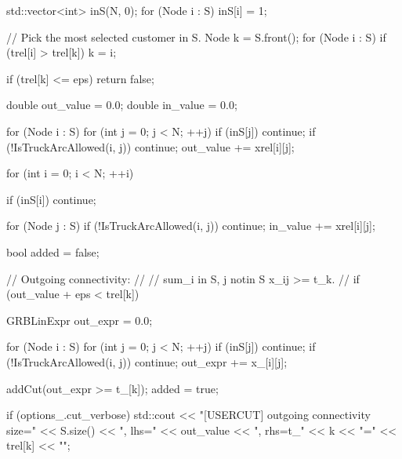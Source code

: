 {{{{                std::vector<int> inS(N, 0);
                for (Node i : S)
                {
                    inS[i] = 1;
                }

                // Pick the most selected customer in S.
                Node k = S.front();
                for (Node i : S)
                {
                    if (trel[i] > trel[k])
                    {
                        k = i;
                    }
                }

                if (trel[k] <= eps)
                {
                    return false;
                }

                double out_value = 0.0;
                double in_value = 0.0;

                for (Node i : S)
                {
                    for (int j = 0; j < N; ++j)
                    {
                        if (inS[j])
                            continue;
                        if (!IsTruckArcAllowed(i, j))
                            continue;
                        out_value += xrel[i][j];
                    }
                }

                for (int i = 0; i < N; ++i)
                {
                    if (inS[i])
                        continue;

                    for (Node j : S)
                    {
                        if (!IsTruckArcAllowed(i, j))
                            continue;
                        in_value += xrel[i][j];
                    }
                }

                bool added = false;

                // Outgoing connectivity:
                //
                //     sum_{i in S, j notin S} x_ij >= t_k.
                //
                if (out_value + eps < trel[k])
                {
                    GRBLinExpr out_expr = 0.0;

                    for (Node i : S)
                    {
                        for (int j = 0; j < N; ++j)
                        {
                            if (inS[j])
                                continue;
                            if (!IsTruckArcAllowed(i, j))
                                continue;
                            out_expr += x_[i][j];
                        }
                    }

                    addCut(out_expr >= t_[k]);
                    added = true;

                    if (options_.cut_verbose)
                    {
                        std::cout << "[USERCUT] outgoing connectivity size="
                                  << S.size()
                                  << ", lhs=" << out_value
                                  << ", rhs=t_" << k
                                  << "=" << trel[k]
                                  << "\n";
                    }
                }

}}}}
